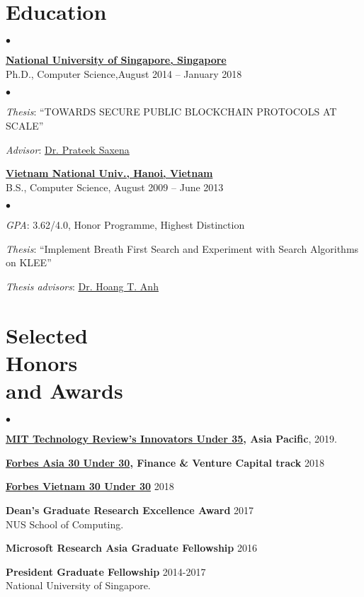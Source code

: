 \documentclass[margin,line]{res}
\newenvironment{list0}{
  \begin{list}{$\bullet$}{%
      \setlength{\itemsep}{0.08in}
      \setlength{\parsep}{0in} \setlength{\parskip}{0in}
      \setlength{\topsep}{0in} \setlength{\partopsep}{0in} 
      \setlength{\leftmargin}{0.0in}}}{\end{list}}
\newenvironment{list2}{
  \begin{list}{$\bullet$}{%
      \setlength{\itemsep}{0in}
      \setlength{\parsep}{0in} \setlength{\parskip}{0in}
      \setlength{\topsep}{0in} \setlength{\partopsep}{0in} 
      \setlength{\leftmargin}{0.2in}}}{\end{list}}
\begin{document}
\begin{resume}
\section{\sc Education}
\begin{list0}
\item \href{http://www.nus.edu.sg}{\textbf {National University of Singapore, Singapore}}\\
Ph.D.,  Computer Science,\hfill August 2014 -- January 2018\\
\vspace{-.1in}
\begin{list2}
\item \emph{Thesis}:  ``TOWARDS SECURE PUBLIC BLOCKCHAIN PROTOCOLS AT SCALE'' 
\item \emph{Advisor}: \href{http://www.comp.nus.edu.sg/~prateeks}{Dr. Prateek Saxena}
\end{list2}
\vspace{.1in}
\item \href{http://uet.vnu.nus.edu.vn}{\textbf{Vietnam National Univ., Hanoi, Vietnam}}\\
B.S., Computer Science, \hfill  August 2009 -- June 2013\\
\vspace{-.1in}
\begin{list2}
\item \emph{GPA}: 3.62/4.0, Honor Programme, Highest Distinction
\item \emph{Thesis}:  ``Implement Breath First Search and Experiment with Search Algorithms on KLEE'' 
\item \emph{Thesis advisors}: \href{http://uet.vnu.edu.vn/~hoangta}{Dr. Hoang T. Anh}
\end{list2}
\end{list0}

\section{\sc Selected\\ Honors \\ and Awards} 
\begin{list0}
\item {\bf \href{https://www.innovatorsunder35.com/the-list/loi-luu/}{MIT Technology Review's Innovators Under 35}, Asia Pacific}, \hfill 2019.
\item {\bf \href{https://www.forbes.com/30-under-30-asia/2018/finance-venture-capital/#2d0f2b5d547f}{Forbes Asia 30 Under 30}, Finance \& Venture Capital track} \hfill 2018
\item {\bf \href{http://event.forbesvietnam.com/30under30/luutheloi.html}{Forbes Vietnam 30 Under 30}} \hfill 2018
\item {\bf  Dean's Graduate Research Excellence Award} \hfill 2017\\
NUS School of Computing.
\item {\bf Microsoft Research Asia Graduate Fellowship} \hfill 2016
\item {\bf President Graduate Fellowship} \hfill 2014-2017\\
National University of Singapore.
\end{list0}


\end{resume}
\end{document}
